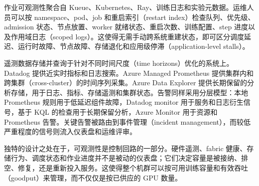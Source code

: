 \documentclass[
  10
]{article}
\begin{document}
作业可观测性聚合自 Kueue、Kubernetes、Ray、训练日志和实验元数据。运维人员可以按 namespace、pod、job 和重启索引（restart index）检查队列、优先级、admission 状态、节点放置、worker 就绪状态、重启次数、训练配置、step 进度以及作用域日志（scoped logs）。这使得无需手动跨系统重建状态，即可区分调度延迟、运行时故障、节点故障、存储退化和应用级停滞（application-level stalls）。

遥测数据存储并查询于针对不同时间尺度（time horizons）优化的系统上。Datadog 提供近实时指标和日志搜索。Azure Managed Prometheus 提供集群内和跨集群（cross-cluster）的时间序列采集。Azure Data Explorer 提供长期保留的分析存储，用于日志、指标、存储遥测和集群状态。告警同样采用分层模型：本地 Prometheus 规则用于低延迟组件故障，Datadog monitor 用于服务和日志衍生信号，基于 KQL 的检查用于长期保留分析，Azure Monitor 用于资源和 Prometheus 告警。关键告警被路由到事件管理（incident management），而较低严重程度的信号则流入仪表盘和运维评审。

独特的设计之处在于，可观测性是控制回路的一部分。硬件遥测、fabric 健康、存储行为、调度状态和作业进度并不是被动的仪表盘；它们决定容量是被接纳、排空、修复，还是重新投入服务。这使得整个机群可以按可用训练容量和有效吞吐（goodput）来管理，而不仅仅是按已供应的 GPU 数量。
\end{document}
